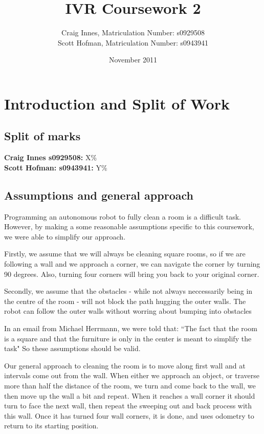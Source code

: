 \documentclass[11pt, a4paper]{article}
\begin{document}
\title{IVR Coursework 2}
\author{Craig Innes, Matriculation Number: s0929508 \\
        Scott Hofman, Matriculation Number: s0943941}
\date{November 2011}
\maketitle

\section{Introduction and Split of Work}

\subsection{Split of marks}
\textbf{Craig Innes s0929508:} X\% \\
\textbf{Scott Hofman: s0943941:} Y\%


\subsection{Assumptions and general approach}
Programming an autonomous robot to fully clean a room is a difficult task. However, by making a some reasonable assumptions specific to this coursework, we were able to simplify our approach.

Firstly, we assume that we will always be cleaning square rooms, so if we are following a wall and we approach a corner, we can navigate the corner by turning 90 degrees. Also, turning four corners will bring you back to your original corner.

Secondly, we assume that the obstacles - while not always neccessarily being in the centre of the room - will not block the path hugging the outer walls. The robot can follow the outer walls without worring about bumping into obstacles

In an email from Michael Herrmann, we were told that:
 ``The fact that the room is a square and that the furniture is only in the center is meant to simplify the task"
 So these assumptions should be valid.

Our general approach to cleaning the room is to move along first wall and at intervals come out from the wall. When either we approach an object, or traverse more than half the distance of the room, we turn and come back to the wall, we then move up the wall a bit and repeat. When it reaches a  wall corner it should turn to face the next wall, then repeat the sweeping out and back process with this wall. Once it has turned four wall corners, it is done, and uses odometry to return to its starting position.
\end{document}
